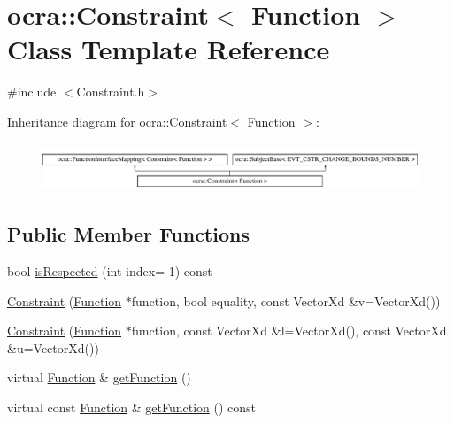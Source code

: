 \hypertarget{classocra_1_1Constraint_3_01Function_01_4}{}\section{ocra\+:\+:Constraint$<$ Function $>$ Class Template Reference}
\label{classocra_1_1Constraint_3_01Function_01_4}


{\ttfamily \#include $<$Constraint.\+h$>$}

Inheritance diagram for ocra\+:\+:Constraint$<$ Function $>$\+:\begin{figure}[H]
\begin{center}
\leavevmode
\includegraphics[height=1.447028cm]{de/d3b/classocra_1_1Constraint_3_01Function_01_4}
\end{center}
\end{figure}
\subsection*{Public Member Functions}
\begin{DoxyCompactItemize}
\item 
bool \hyperlink{classocra_1_1Constraint_3_01Function_01_4_a8406632b9e28804d9d8848a8e71ccbd8}{is\+Respected} (int index=-\/1) const
\end{DoxyCompactItemize}
{\bf }\par
\begin{DoxyCompactItemize}
\item 
\hyperlink{classocra_1_1Constraint_3_01Function_01_4_aefef89fd502e8f1fed23be307f71b508}{Constraint} (\hyperlink{classocra_1_1Function}{Function} $\ast$function, bool equality, const Vector\+Xd \&v=Vector\+Xd())
\item 
\hyperlink{classocra_1_1Constraint_3_01Function_01_4_a9b8a02fdfb62c2d3d774552baccd268b}{Constraint} (\hyperlink{classocra_1_1Function}{Function} $\ast$function, const Vector\+Xd \&l=Vector\+Xd(), const Vector\+Xd \&u=Vector\+Xd())
\end{DoxyCompactItemize}

{\bf }\par
\begin{DoxyCompactItemize}
\item 
virtual \hyperlink{classocra_1_1Function}{Function} \& \hyperlink{classocra_1_1Constraint_3_01Function_01_4_a81f1d8de34c0a123bc77d4798619fe9b}{get\+Function} ()
\item 
virtual const \hyperlink{classocra_1_1Function}{Function} \& \hyperlink{classocra_1_1Constraint_3_01Function_01_4_ad7f2ac6dfb90ed0231cc3e73ef592581}{get\+Function} () const
\end{DoxyCompactItemize}

